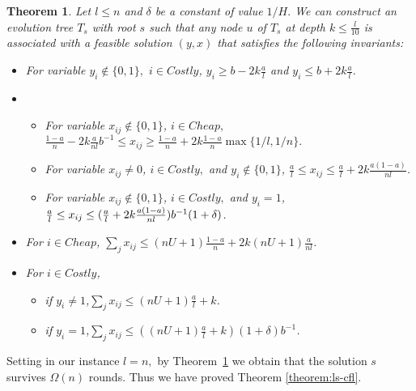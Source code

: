 \documentclass[11pt]{article}\usepackage{amsmath}
\newtheorem{theorem}{Theorem}[section]
\begin{document}
\begin{theorem}\label{smalltheorem}
Let $l \leq n$ and $\delta$ be a constant of value $1/H.$ 
 We can construct an evolution tree $T_s$ with root $s$
such that
any  node  $u$ of $T_s$ at depth $k \leq \frac{l}{10}$ 
is associated with a  feasible solution $(y,x)$ that satisfies the following invariants:\\
\vspace*{-0.8cm}
\begin{itemize}
\item[1] For variable $y_i\notin \{0,1\},$ $i \in Costly$, $y_i \geq b-2k\frac{a}{l}$
 and $y_{i}\leq b+2k\frac{a}{l}.$
\item[2] 
\begin{itemize}
\item[(a)] For variable $x_{ij} \notin \{0,1\}$, $i \in Cheap,$
  $\frac{1-a}{n}-2k\frac{a}{nl}b^{-1} \leq  x_{ij} \geq \frac{1-a}{n}+2k\frac{1-a}{n}\max\{1/l,1/n\}.$
\item[(b)] For variable $x_{ij} \neq 0$, $i \in Costly,$ and $y_i \notin \{0,1\}$, $\frac{a}{l} \leq x_{ij}\leq \frac{a}{l}+2k\frac{a(1-a)}{nl}$.
\item[(c)]  For variable $x_{ij} \notin \{0,1\}$, $i \in Costly,$ and
  $y_i=1$, $\frac{a}{l} \leq x_{ij}\leq
  (\frac{a}{l}+2k\frac{a(1-a)}{nl})b^{-1}(1+\nolinebreak \delta)$.
\end{itemize}
\item[3] For $i \in Cheap$, $\sum_{j}x_{ij} \leq (nU+1)\frac{1-a}{n}+2k(nU+1)\frac{a}{nl}$.
\item[4] For $i \in Costly$,
\begin{itemize}
\item[(a)]  if $y_i \neq 1$,$\sum_j x_{ij}\leq (nU+1)\frac{a}{l}+k$.
\item[(b)]  if $y_i = 1$,$\sum_j x_{ij}\leq ((nU+1)\frac{a}{l}+k)(1+\delta)b^{-1}$.
\end{itemize}

\end{itemize}

\end{theorem}




Setting in our instance $l=n,$ by Theorem~\ref{smalltheorem} we obtain that the solution
$s$ survives $\Omega(n)$ rounds. 
Thus we have proved Theorem \ref{theorem:ls-cfl}.
\end{document}
